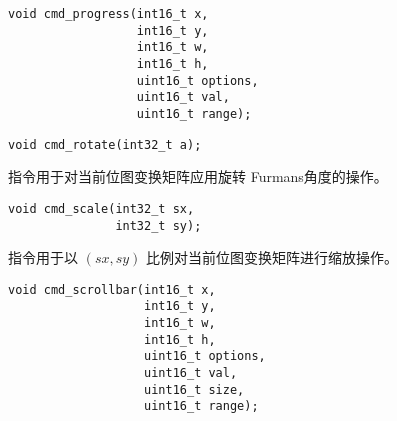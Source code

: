 

\begin{framed}
\begin{verbatim}
void cmd_progress(int16_t x,
                  int16_t y,
                  int16_t w,
                  int16_t h,
                  uint16_t options,
                  uint16_t val,
                  uint16_t range);
\end{verbatim}
\end{framed}



\begin{framed}
\begin{verbatim}
void cmd_rotate(int32_t a);
\end{verbatim}
\end{framed}

 指令用于对当前位图变换矩阵应用旋转  Furmans角度的操作。


\begin{framed}
\begin{verbatim}
void cmd_scale(int32_t sx,
               int32_t sy);
\end{verbatim}
\end{framed}

 指令用于以 $(sx, sy)$ 比例对当前位图变换矩阵进行缩放操作。
\fsixteen


\begin{framed}
\begin{verbatim}
void cmd_scrollbar(int16_t x,
                   int16_t y,
                   int16_t w,
                   int16_t h,
                   uint16_t options,
                   uint16_t val,
                   uint16_t size,
                   uint16_t range);
\end{verbatim}
\end{framed}

